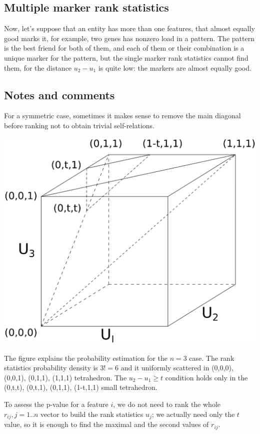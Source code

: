 \documentclass{llncs}
\begin{document}
\subsection{Multiple marker rank statistics}
Now, let's suppose that an entity has more than one features, that almost equally good marks it, for example, two genes has nonzero load in a pattern. The pattern is the best friend for both of them, and each of them or their combination is a unique marker for the pattern, but the single marker rank statistics cannot find them, for the distance $u_2-u_1$ is quite low: the markers are almost equally good.

\subsection*{Notes and comments}

For a symmetric case, sometimes it makes sense to remove the main diagonal before ranking not to obtain trivial self-relations.

\includegraphics[scale=.5,trim=0 10cm 0 0, clip=true]{rank3d-nocolour}

The figure explains the probability estimation for the $n=3$ case. The rank statistics probability density is $3!=6$ and it uniformly scattered in (0,0,0), (0,0,1), (0,1,1), (1,1,1) tetrahedron. The $u_2 - u_1 \ge t$ condition holds only in the (0,t,t), (0,t,1), (0,1,1), (1-t,1,1) small tetrahedron.

To assess the p-value for a feature $i$, we do not need to rank the whole $r_{ij}, j=1..n$ vector to build the rank statistics $u_j$; we actually need only the $t$ value, so it is enough to find the maximal and the second values of $r_{ij}$.
\end{document}
